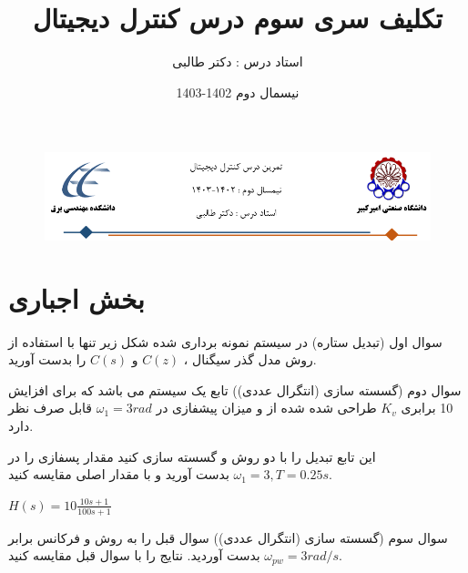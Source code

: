 \documentclass[12pt]{article}
\title{تکلیف سری سوم درس کنترل دیجیتال}
\date{نیسمال دوم 1402-1403}
\author{استاد درس : دکتر طالبی}
\begin{document}
\markboth{\theauthor}{\thetitle}



\begin{figure}[htbp]
    \centering
    \includegraphics[width=\linewidth]{Header.png}
\end{figure}


\section{بخش اجباری}

    \begin{problem}{سوال اول}
    (تبدیل ستاره) در سیستم نمونه برداری شده شکل زیر تنها با استفاده از روش مدل گذر سیگنال ، 
    $C(z)$
    و
    $C(s)$
    را بدست آورید.

    \end{problem}
    
    
    
    \begin{problem}{سوال دوم}
  (گسسته سازی (انتگرال عددی)) تابع یک سیستم  می باشد که برای افزایش 10 برابری 
  $K_v$
  طراحی شده شده از و میزان پیشفازی در 
  $\omega_1 = 3 rad$
  قابل صرف نظر دارد.
  
  این تابع تبدیل را با دو روش 
  و
  گسسته سازی کنید مقدار پسفازی را در 
  $\omega_1 = 3 , T = 0.25s$
  بدست آورید و با مقدار اصلی مقایسه کنید.
  
  \centering
 $H(s) = 10\frac{10s + 1}{100s + 1}$
    \end{problem}
    
    \begin{problem}{سوال سوم}
    	(گسسته سازی (انتگرال عددی))
سوال قبل را به روش 
و فرکانس 
برابر 
$\omega_{pw} = 3 rad/s$
بدست آوردید.
نتایج را با سوال قبل مقایسه کنید.
    \end{problem}
    
\end{document}
